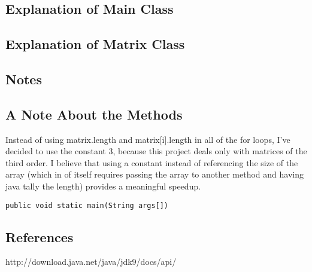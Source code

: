 \documentclass[12pt]{article}
\begin{document}
\newpage %



\begin{center}
\section{Explanation of Main Class}
\end{center}



\newpage %



\begin{center}
\section{Explanation of Matrix Class}
\end{center}



\newpage %



\begin{center}
\section{Notes}
\end{center}
\subsection{A Note About the Methods}
Instead of using matrix.length and matrix[i].length in all of the for loops, I've decided to use the constant 3, because this project deals only with matrices of the third order. I believe that using a constant instead of referencing the size of the array (which in of itself requires passing the array to another method and having java tally the length) provides a meaningful speedup.
\begin{verbatim}
public void static main(String args[])
\end{verbatim}


\newpage %



\begin{center}
\section{References}
\end{center}
http://download.java.net/java/jdk9/docs/api/
\end{document}
